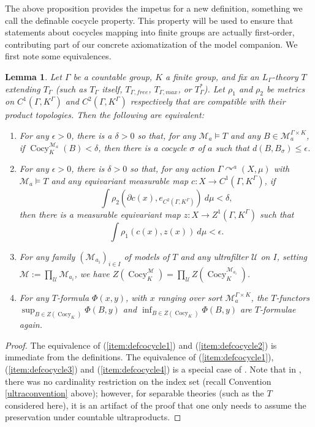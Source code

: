 \documentclass[12pt]{amsart}
\newtheorem{lem}[thm]{Lemma}
\theoremstyle{definition}
\def\cal{\mathcal}
\def\u{\mathsf 1}
\def \u{\mathcal U}
\def\Cocy{\operatorname{Cocy}}
\newcommand{\acts}{\curvearrowright}
\begin{document}
The above proposition provides the impetus for a new definition, something we call the definable cocycle property. This property will be used to ensure that statements about cocycles mapping into finite groups are actually first-order, contributing part of our concrete axiomatization of the model companion. We first note some equivalences.

\begin{lem} \label{lem:defcocycle}
    Let $\Gamma$ be a countable group, $K$ a finite group, and fix an $L_\Gamma$-theory $T$ extending $T_\Gamma$ (such as $T_\Gamma$ itself, $T_{\Gamma,free}$, $T_{\Gamma,max}$, or $T_{\Gamma}^*$). Let $\rho_1$ and $\rho_2$ be metrics on $C^1(\Gamma, K^\Gamma)$ and $C^2(\Gamma, K^\Gamma)$ respectively that are compatible with their product topologies. Then the following are equivalent:
    \begin{enumerate}
        \item \label{item:defcocycle1} For any $\epsilon>0$, there is a $\delta>0$ so that, for any $\cal M_a\models T$ and any $B\in \cal M_a^{\Gamma\times K}$, if $\Cocy_K^{\cal M_a}(B)<\delta$, then there is a cocycle $\sigma$ of $a$ such that $d(B,B_\sigma)\leq\epsilon$.
        \item \label{item:defcocycle2} For any $\epsilon > 0$, there is $\delta > 0$ so that, for any action $\Gamma \acts^a (X, \mu)$ with $\cal M_a \models T$ and any equivariant measurable map $c : X \rightarrow C^1(\Gamma, K^\Gamma)$, if
        \[\int \rho_2(\partial c(x), e_{C^2(\Gamma, K^\Gamma)}) \ d \mu < \delta,\]
        then there is a measurable equivariant map $z : X \rightarrow Z^1(\Gamma, K^\Gamma)$ such that
        \[\int \rho_1(c(x),z(x)) \ d \mu < \epsilon.\]
        \item \label{item:defcocycle3} For any family $(\cal M_{a_i})_{i\in I}$ of models of $T$ and any ultrafilter $\u$ on $I$, setting $\cal M:=\prod_\u \cal M_{a_i}$, we have $Z(\Cocy_K^{\cal M})=\prod_\u Z(\Cocy_K^{\cal M_{a_i}})$.
        \item \label{item:defcocycle4} For any $T$-formula $\Phi(x,y)$, with $x$ ranging over sort $\cal M_a^{\Gamma\times K}$, the $T$-functors $\sup_{B\in Z(\Cocy_K)} \Phi(B,y)$ and $\inf_{B\in Z(\Cocy_K)} \Phi(B,y)$ are $T$-formulae again.
    \end{enumerate}
\end{lem}

\begin{proof}
    The equivalence of (\ref{item:defcocycle1}) and (\ref{item:defcocycle2}) is immediate from the definitions. The equivalence of (\ref{item:defcocycle1}), (\ref{item:defcocycle3}) and (\ref{item:defcocycle4}) is a special case of \cite[Theorem 2.13]{spgap}. Note that in \cite[Theorem 2.13]{spgap}, there was no cardinality restriction on the index set (recall Convention \ref{ultraconvention} above); however, for separable theories (such as the $T$ considered here), it is an artifact of the proof that one only needs to assume the preservation under countable ultraproducts.
\end{proof}
\end{document}
